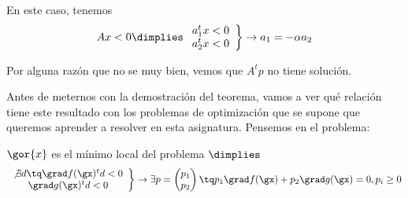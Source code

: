 En este caso, tenemos \[Ax < 0 \dimplies \left.\begin{array}{c}a_1^tx < 0\\a_2^tx<0\end{array}\right\} \to a_1 = -\alpha a_2\]


Por alguna razón que no se muy bien, vemos que $A^tp$ no tiene solución.


Antes de meternos con la demostración del teorema, vamos a ver qué relación tiene este resultado con los problemas de optimización que se supone que queremos aprender a resolver en esta asignatura.
Pensemos en el problema:
\begin{ioprob}
\end{ioprob}

$\gor{x}$ es el mínimo local del problema $\dimplies$
\[\left.\begin{array}{c}\not\exists d \tq \grad f(\gx)^td < 0 \\ \grad g(\gx)^td < 0\end{array}\right\} \to \exists p = \begin{pmatrix}p_1\\p_2\end{pmatrix} \tq p_1\grad f(\gx) + p_2 \grad g(\gx) = 0, p_i \geq 0\]


